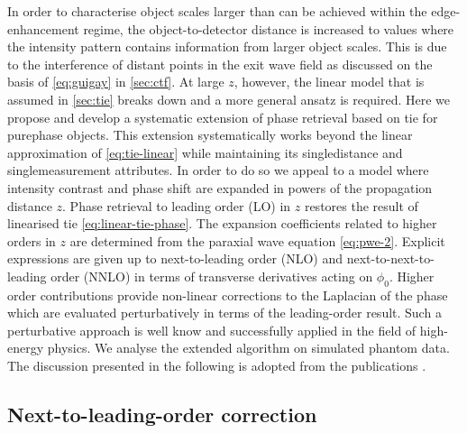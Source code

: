 \documentclass[
twoside,
openright,
titlepage,
numbers=noenddot,
headinclude,
fleqn,
a4paper,
footinclude=true,
cleardoublepage=empty,
abstractoff,
BCOR=5mm,
paper=a4,
fontsize=11pt,
british,ngerman,american,
]{scrreprt}
\begin{document}
In order to characterise object scales larger than can be achieved
within the edge-enhancement regime, the object-to-detector distance is
increased to values where the intensity pattern contains information
from larger object scales.  This is due to the interference of distant
points in the exit wave field as discussed on the basis of
\cref{eq:guigay} in \cref{sec:ctf}.  At large $z$, however, the linear
model that is assumed in \cref{sec:tie} breaks down and a more general
ansatz is required.  Here we propose and develop a systematic
extension of phase retrieval based on \acf{tie} for pure\hyph phase
objects.  This extension systematically works beyond the linear
approximation of \cref{eq:tie-linear} while maintaining its
single\hyph distance and single\hyph measurement attributes.  In order
to do so we appeal to a model where intensity contrast and phase shift
are expanded in powers of the propagation distance $z$.  Phase
retrieval to leading order (LO) in $z$ restores the result of
linearised \ac{tie} \eqref{eq:linear-tie-phase}.  The expansion
coefficients related to higher orders in $z$ are determined from the
paraxial wave equation \eqref{eq:pwe-2}.  Explicit expressions are
given up to next-to-leading order (NLO) and next-to-next-to-leading
order (NNLO) in terms of transverse derivatives acting on $\phi_0$.
Higher order contributions provide non-linear corrections to the
Laplacian of the phase which are evaluated perturbatively in terms of
the leading-order result.  Such a perturbative approach is well know
and successfully applied in the field of high-energy physics.  We
analyse the extended algorithm on simulated phantom data.  The
discussion presented in the following is adopted from the publications
\cite{Moosmann2010opex,Moosmann2011pssa}.

\subsection{Next-to-leading-order correction}
\label{sec:nlo}
\end{document}

